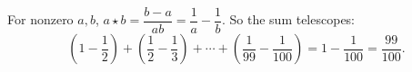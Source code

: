 For nonzero $a,b$, $a\star b=\dfrac{b-a}{ab}=\dfrac1a-\dfrac1b$. So the sum telescopes:
\[\left(1-\dfrac12\right)+\left(\dfrac12-\dfrac13\right)+\cdots+\left(\dfrac1{99}-\dfrac1{100}\right)=1-\dfrac1{100}=\boxed{\dfrac{99}{100}}.\]
